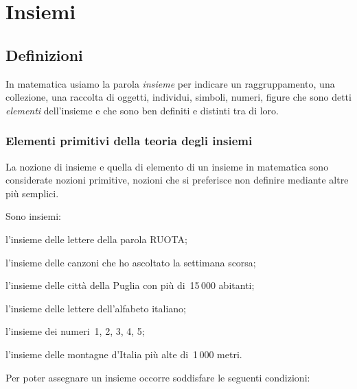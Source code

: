 


\chapter{Insiemi}

\section{Definizioni}
\label{sec:insiemi_definizioni}

In matematica usiamo la parola \textit{insieme} per indicare un
raggruppamento, una collezione, una raccolta di oggetti, individui,
simboli, numeri, figure che sono detti \textit{elementi}
dell'insieme e che sono ben definiti e distinti tra di
loro.

\subsection{Elementi primitivi della teoria degli insiemi}
\label{subsec:el_prim}

La nozione di insieme e quella di elemento di un insieme in matematica
sono considerate nozioni primitive, nozioni che si preferisce non
definire mediante altre più semplici.

 \begin{esempio}
 Sono insiemi:
 \begin{enumeratea}
  \item l'insieme delle lettere della parola RUOTA;
  \item l'insieme delle canzoni che ho ascoltato la settimana scorsa;
  \item l'insieme delle città della Puglia con più di~15\,000 abitanti;
  \item l'insieme delle lettere dell'alfabeto italiano;
  \item l'insieme dei numeri~1, 2, 3, 4, 5;
  \item l'insieme delle montagne d'Italia più alte di~1\,000 metri.
 \end{enumeratea}
 \end{esempio}

Per poter assegnare un insieme occorre soddisfare le seguenti condizioni:

